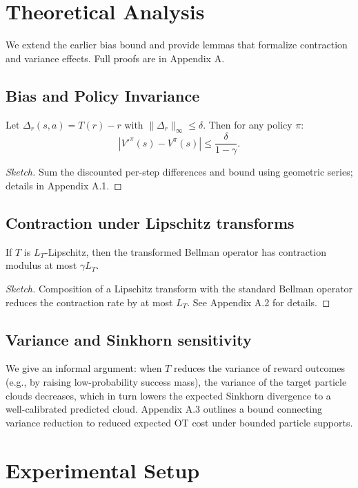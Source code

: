 \documentclass[10pt,twocolumn]{article}
\begin{document}
\section{Theoretical Analysis}
We extend the earlier bias bound and provide lemmas that formalize contraction and variance effects. Full proofs are in Appendix A.

\subsection{Bias and Policy Invariance}
\begin{lemma}
Let $\Delta_r(s,a)=T(r)-r$ with $\|\Delta_r\|_\infty\le\delta$. Then for any policy $\pi$:
\begin{equation}
|V'^\pi(s)-V^\pi(s)| \le \frac{\delta}{1-\gamma}.
\end{equation}
\end{lemma}
\begin{proof}[Sketch]
Sum the discounted per-step differences and bound using geometric series; details in Appendix A.1.
\end{proof}

\subsection{Contraction under Lipschitz transforms}
\begin{lemma}
If $T$ is $L_T$-Lipschitz, then the transformed Bellman operator has contraction modulus at most $\gamma L_T$.
\end{lemma}
\begin{proof}[Sketch]
Composition of a Lipschitz transform with the standard Bellman operator reduces the contraction rate by at most $L_T$. See Appendix A.2 for details.
\end{proof}

\subsection{Variance and Sinkhorn sensitivity}
We give an informal argument: when $T$ reduces the variance of reward outcomes (e.g., by raising low-probability success mass), the variance of the target particle clouds decreases, which in turn lowers the expected Sinkhorn divergence to a well-calibrated predicted cloud. Appendix A.3 outlines a bound connecting variance reduction to reduced expected OT cost under bounded particle supports.

\section{Experimental Setup}
\end{document}
